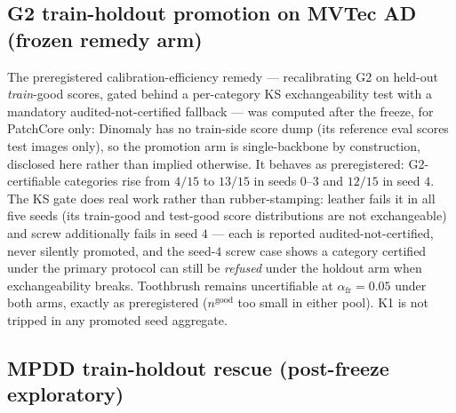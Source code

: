 \documentclass[11pt]{article}
\begin{document}
\subsection{G2 train-holdout promotion on MVTec AD (frozen remedy arm)}
\label{sec:g2promo}

The preregistered calibration-efficiency remedy --- recalibrating G2 on held-out
\emph{train}-good scores, gated behind a per-category KS exchangeability test with a mandatory
audited-not-certified fallback --- was computed after the freeze,
for PatchCore only: Dinomaly has no train-side score dump (its reference eval scores
test images only), so the promotion arm is single-backbone by construction, disclosed here
rather than implied otherwise. It behaves as preregistered: G2-certifiable categories rise from
$4/15$ to $13/15$ in seeds $0$--$3$ and $12/15$ in seed $4$. The KS gate does real work rather than rubber-stamping:
leather fails it in all five seeds (its train-good and test-good score distributions are not
exchangeable) and screw additionally fails in seed $4$ --- each is reported
audited-not-certified, never silently promoted, and the seed-$4$ screw case shows a category
certified under the primary protocol can still be \emph{refused} under the holdout arm when
exchangeability breaks. Toothbrush remains uncertifiable at $\alpha_{\text{fr}}=0.05$ under both
arms, exactly as preregistered ($n^{\text{good}}$ too small in either pool). K1 is not tripped
in any promoted seed aggregate.

\subsection{MPDD train-holdout rescue (post-freeze exploratory)}
\label{sec:mpddholdout}
\end{document}
